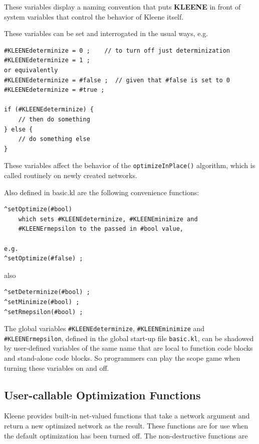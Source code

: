 \documentclass[letterpaper,12pt]{article}
\begin{document}
\noindent
These variables display a naming convention that puts \textbf{KLEENE} in front
of system variables that control the behavior of Kleene itself.

These variables can be set and interrogated in the usual ways, e.g.

\begin{Verbatim}[fontsize=\small]
#KLEENEdeterminize = 0 ;	// to turn off just determinization
#KLEENEdeterminize = 1 ;
or equivalently
#KLEENEdeterminize = #false ;  // given that #false is set to 0
#KLEENEdeterminize = #true ;

if (#KLEENEdeterminize) {
    // then do something
} else {
    // do something else
}
\end{Verbatim}

\noindent 
These variables affect the behavior of the \texttt{optimizeInPlace()}
algorithm, which is called routinely on newly created networks.

Also defined in basic.kl are the following convenience functions:

\begin{Verbatim}[fontsize=\small]
^setOptimize(#bool)
	which sets #KLEENEdeterminize, #KLEENEminimize and
	#KLEENErmepsilon to the passed in #bool value, 
	
e.g.
^setOptimize(#false) ;
\end{Verbatim}

\noindent
also

\begin{Verbatim}[fontsize=\small]
^setDeterminize(#bool) ;
^setMinimize(#bool) ;
^setRmepsilon(#bool) ;
\end{Verbatim}

The global variables \verb!#KLEENEdeterminize!, \verb!#KLEENEminimize!
and \verb!#KLEENErmepsilon!, defined in the global start-up file
\texttt{basic.kl}, can be shadowed by user-defined variables of the same
name that are local to function code blocks and stand-alone code blocks.
So programmers can play the scope game when turning these variables on
and off.

\subsection{User-callable Optimization Functions}

Kleene provides built-in net-valued functions that take a network
argument and return a new optimized network as the result.  These
functions are for use when the default optimization has been turned off.
The non-destructive functions are
\end{document}
